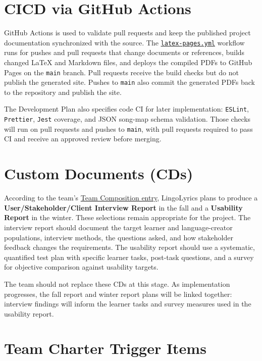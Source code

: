 \documentclass{article}
\begin{document}
\section{CICD via GitHub Actions}

GitHub Actions is used to validate pull requests and keep the published project
documentation synchronized with the source.  The
\href{https://github.com/rhea333/LingoLyrics/blob/main/.github/workflows/latex-pages.yml}
{\texttt{latex-pages.yml}} workflow runs for pushes and pull requests that
change documents or references, builds changed LaTeX and Markdown files, and
deploys the compiled PDFs to GitHub Pages on the \texttt{main} branch.
Pull requests receive the build checks but do not publish the generated site.
Pushes to \texttt{main} also commit the generated PDFs back to the repository
and publish the site.

The Development Plan also specifies code CI for later implementation:
\texttt{ESLint}, \texttt{Prettier}, \texttt{Jest} coverage, and JSON
song-map schema validation.  Those checks will run on pull requests and pushes
to \texttt{main}, with pull requests required to pass CI and receive an
approved review before merging.

\section{Custom Documents (CDs)}

According to the team's
\href{https://gitlab.cas.mcmaster.ca/courses/capstone/-/blob/main/Teams/TeamComposition.csv}
{Team Composition entry}, LingoLyrics plans to produce a
\textbf{User/Stakeholder/Client Interview Report} in the fall and a
\textbf{Usability Report} in the winter.  These selections remain appropriate
for the project.  The interview report should document the target learner and
language-creator populations, interview methods, the questions asked, and
how stakeholder feedback changes the requirements.  The usability report should
use a systematic, quantified test plan with specific learner tasks, post-task
questions, and a survey for objective comparison against usability targets.

The team should not replace these CDs at this stage.  As implementation
progresses, the fall report and winter report plans will be linked together:
interview findings will inform the learner tasks and survey measures used in
the usability report.

\section{Team Charter Trigger Items}
\end{document}

